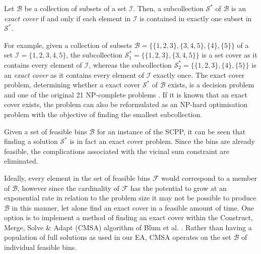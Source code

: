 \documentclass{IEEEtran}
\begin{document}
\begin{definition}
	Let $\mathcal{B}$ be a collection of subsets of a set $\mathcal{I}$. Then, a subcollection $\mathcal{S}^*$ of $\mathcal{B}$ is an \emph{exact cover} if and only if each element in $\mathcal{I}$ is contained in exactly one subset in $\mathcal{S}^*$.
	\label{defn:exactcover}
\end{definition}	

For example, given a collection of subsets $\mathcal{B} = \{\{1,2,3\}, \{3,4,5\}, \{4\}, \{5\}\}$ of a set $\mathcal{I} = \{1,2,3,4,5\}$, the subcollection $\mathcal{S}^*_1 = \{\{1,2,3\}, \{3,4,5\}\}$ is a set cover as it contains every element of $\mathcal{I}$, whereas the subcollection $\mathcal{S}^*_2 = \{\{1,2,3\}, \{4\}, \{5\}\}$ is an \emph{exact cover} as it contains every element of $\mathcal{I}$ exactly once. The exact cover problem, determining whether a exact cover $\mathcal{S}^*$ of $\mathcal{B}$ exists, is a decision problem and one of the original 21 NP-complete problems \cite{karp1972}. If it is known that an exact cover exists, the problem can also be reformulated as an NP-hard optimisation problem with the objective of finding the smallest subcollection.

Given a set of feasible bins $\mathcal{B}$ for an instance of the SCPP, it can be seen that finding a solution $\mathcal{S}^*$ is in fact an exact cover problem. Since the bins are already feasible, the complications associated with the vicinal sum constraint are eliminated.

Ideally, every element in the set of feasible bins $\mathcal{F}$ would correspond to a member of $\mathcal{B}$, however since the cardinality of $\mathcal{F}$ has the potential to grow at an exponential rate in relation to the problem size it may not be possible to produce $\mathcal{B}$ in this manner, let alone find an exact cover in a feasible amount of time. One option is to implement a method of finding an exact cover within the Construct, Merge, Solve \& Adapt (CMSA) algorithm of Blum et al. \cite{blum2016}. Rather than having a population of full solutions as used in our EA, CMSA operates on the set $\mathcal{B}$ of individual feasible bins.

\end{document}
